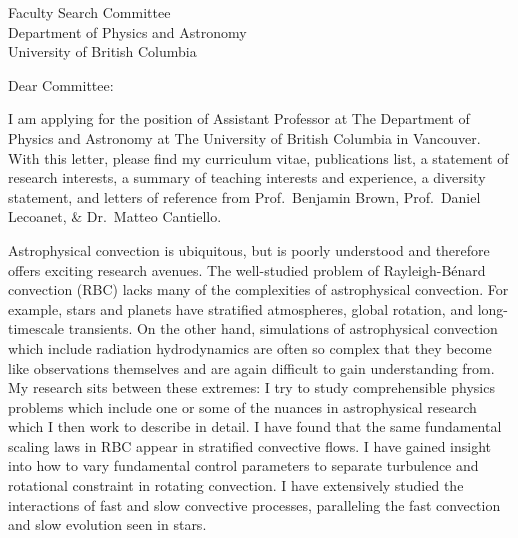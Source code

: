 \documentclass[12pt]{letter}
\begin{document}
\begin{letter}{
               Faculty Search Committee \\
               Department of Physics and Astronomy \\
               University of British Columbia
           }

\opening{Dear Committee:}

    I am applying for the position of Assistant Professor at The Department of Physics and Astronomy at The University of British Columbia in Vancouver.
    With this letter, please find my curriculum vitae, publications list, a statement of research interests, a summary of teaching interests and experience, a diversity statement, and letters of reference from Prof.~Benjamin Brown, Prof.~Daniel Lecoanet, \& Dr.~Matteo Cantiello.

    Astrophysical convection is ubiquitous, but is poorly understood and therefore offers exciting research avenues.
    The well-studied problem of Rayleigh-B\'{e}nard convection (RBC) lacks many of the complexities of astrophysical convection.
    For example, stars and planets have stratified atmospheres, global rotation, and long-timescale transients.
    On the other hand, simulations of astrophysical convection which include radiation hydrodynamics are often so complex that they become like observations themselves and are again difficult to gain understanding from.
    My research sits between these extremes: I try to study comprehensible physics problems which include one or some of the nuances in astrophysical research which I then work to describe in detail.
    I have found that the same fundamental scaling laws in RBC appear in stratified convective flows.
    I have gained insight into how to vary fundamental control parameters to separate turbulence and rotational constraint in rotating convection.
    I have extensively studied the interactions of fast and slow convective processes, paralleling the fast convection and slow evolution seen in stars.


\end{letter}
\end{document}
